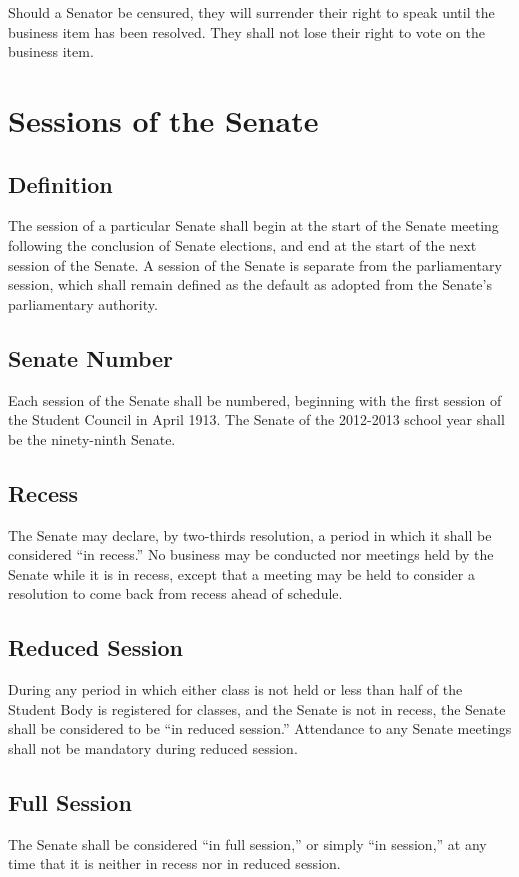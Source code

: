 \documentclass[12pt]{scrreprt}
\begin{document}
Should a Senator be censured, they will surrender their right to speak until the business item has been resolved. They shall not lose their right to vote on the business item. 

\section{Sessions of the Senate} \label{sec:senate_sessions}

\subsection{Definition}
The session of a particular Senate shall begin at the start of the Senate 
meeting following the conclusion of Senate elections, and end at the start of 
the next session of the Senate. A session of the Senate is separate from the
parliamentary session, which shall remain defined as the default as adopted
from the Senate’s parliamentary authority.

\subsection{Senate Number}
Each session of the Senate shall be numbered, beginning with the first session 
of the Student Council in April 1913. The Senate of the 2012-2013 school year 
shall be the ninety-ninth Senate. 

\subsection{Recess}
The Senate may declare, by two-thirds resolution, a period in which it shall 
be considered ``in recess.'' No business may be conducted nor meetings held by 
the Senate while it is in recess, except that a meeting may be held to 
consider a resolution to come back from recess ahead of schedule. 

\subsection{Reduced Session}
During any period in which either class is not held or less than half of the 
Student Body is registered for classes, and the Senate is not in recess, the 
Senate shall be considered to be ``in reduced session.'' Attendance to any 
Senate meetings shall not be mandatory during reduced session. 

\subsection{Full Session}
The Senate shall be considered ``in full session,'' or simply ``in session,'' 
at any time that it is neither in recess nor in reduced session. 
\end{document}
